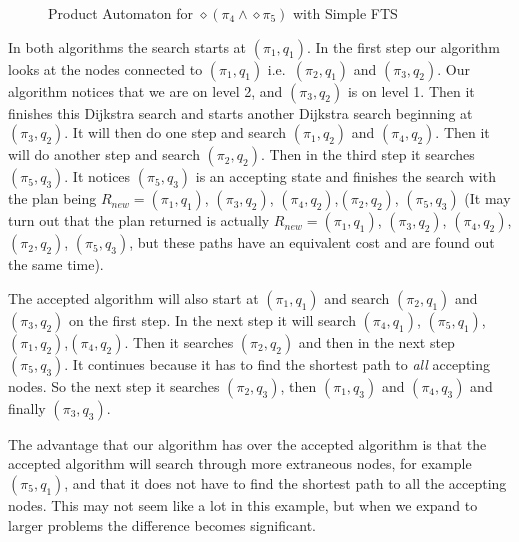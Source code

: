 \begin{figure}
\caption{Product Automaton for $\diamond (\pi_4 \wedge \diamond \pi_5)$ with Simple FTS}
\label{fig:Sequencing}
\end{figure}
In both algorithms the search starts at $(\pi_1,q_1)$. In the first step our algorithm looks at the nodes connected to $(\pi_1,q_1)$ i.e.\ $(\pi_2,q_1)$ and $(\pi_3,q_2)$. Our algorithm notices that we are on level 2, and $(\pi_3,q_2)$ is on level 1. Then it finishes this Dijkstra search and starts another Dijkstra search beginning at $(\pi_3,q_2)$. It will then do one step and search $(\pi_1,q_2)$ and $(\pi_4,q_2)$. Then it will do another step and search $(\pi_2,q_2)$. Then in the third step it searches $(\pi_5,q_3)$. It notices $(\pi_5,q_3)$ is an accepting state and finishes the search with the plan being $R_{new} = (\pi_1,q_1)$, $(\pi_3,q_2)$, $(\pi_4,q_2)$,$(\pi_2,q_2)$, $(\pi_5,q_3)$ (It may turn out that the plan returned is actually $R_{new}=(\pi_1,q_1)$, $(\pi_3,q_2)$, $(\pi_4,q_2)$,$(\pi_2,q_2)$, $(\pi_5,q_3)$, but these paths have an equivalent cost and are found out the same time). 

The accepted algorithm will also start at $(\pi_1,q_1)$ and search $(\pi_2,q_1)$ and $(\pi_3,q_2)$ on the first step. In the next step it will search $(\pi_4,q_1)$, $(\pi_5,q_1)$, $(\pi_1,q_2)$,$(\pi_4,q_2)$. Then it searches $(\pi_2,q_2)$ and then in the next step $(\pi_5,q_3)$. It continues because it has to find the shortest path to \textit{all} accepting nodes. So the next step it searches $(\pi_2,q_3)$, then $(\pi_1,q_3)$ and $(\pi_4,q_3)$ and finally $(\pi_3,q_3)$.

The advantage that our algorithm has over the accepted algorithm is that the accepted algorithm will search through more extraneous nodes, for example $(\pi_5,q_1)$, and that it does not have to find the shortest path to all the accepting nodes. This may not seem like a lot in this example, but when we expand to larger problems the difference becomes significant. 

